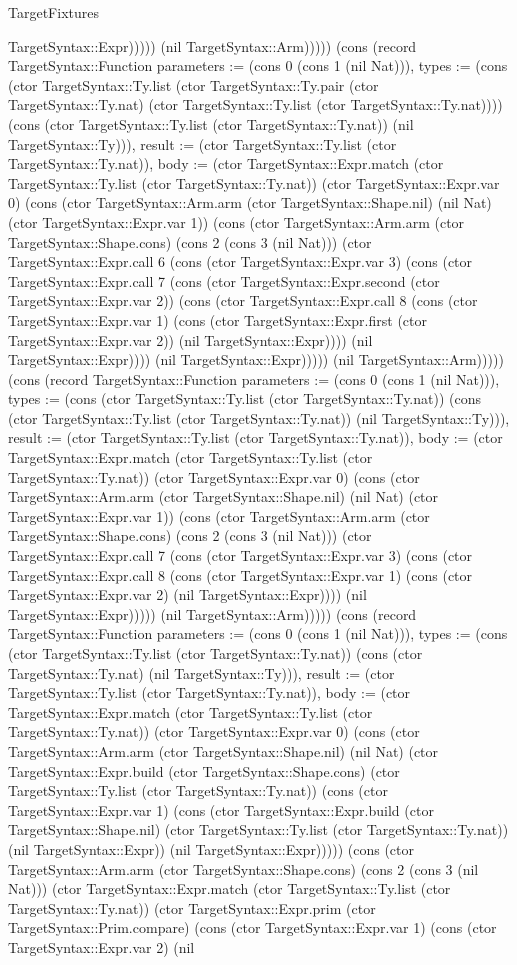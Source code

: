 \begin{lexlean}{TargetFixtures}
\begin{semanticmodule}
{TargetSyntax::Expr))))) (nil TargetSyntax::Arm))))}) (cons (record TargetSyntax::Function {parameters := (cons 0 (cons 1 (nil Nat))), types := (cons (ctor TargetSyntax::Ty.list (ctor TargetSyntax::Ty.pair (ctor TargetSyntax::Ty.nat) (ctor TargetSyntax::Ty.list (ctor TargetSyntax::Ty.nat)))) (cons (ctor TargetSyntax::Ty.list (ctor TargetSyntax::Ty.nat)) (nil TargetSyntax::Ty))), result := (ctor TargetSyntax::Ty.list (ctor TargetSyntax::Ty.nat)), body := (ctor TargetSyntax::Expr.match (ctor TargetSyntax::Ty.list (ctor TargetSyntax::Ty.nat)) (ctor TargetSyntax::Expr.var 0) (cons (ctor TargetSyntax::Arm.arm (ctor TargetSyntax::Shape.nil) (nil Nat) (ctor TargetSyntax::Expr.var 1)) (cons (ctor TargetSyntax::Arm.arm (ctor TargetSyntax::Shape.cons) (cons 2 (cons 3 (nil Nat))) (ctor TargetSyntax::Expr.call 6 (cons (ctor TargetSyntax::Expr.var 3) (cons (ctor TargetSyntax::Expr.call 7 (cons (ctor TargetSyntax::Expr.second (ctor TargetSyntax::Expr.var 2)) (cons (ctor TargetSyntax::Expr.call 8 (cons (ctor TargetSyntax::Expr.var 1) (cons (ctor TargetSyntax::Expr.first (ctor TargetSyntax::Expr.var 2)) (nil TargetSyntax::Expr)))) (nil TargetSyntax::Expr)))) (nil TargetSyntax::Expr))))) (nil TargetSyntax::Arm))))}) (cons (record TargetSyntax::Function {parameters := (cons 0 (cons 1 (nil Nat))), types := (cons (ctor TargetSyntax::Ty.list (ctor TargetSyntax::Ty.nat)) (cons (ctor TargetSyntax::Ty.list (ctor TargetSyntax::Ty.nat)) (nil TargetSyntax::Ty))), result := (ctor TargetSyntax::Ty.list (ctor TargetSyntax::Ty.nat)), body := (ctor TargetSyntax::Expr.match (ctor TargetSyntax::Ty.list (ctor TargetSyntax::Ty.nat)) (ctor TargetSyntax::Expr.var 0) (cons (ctor TargetSyntax::Arm.arm (ctor TargetSyntax::Shape.nil) (nil Nat) (ctor TargetSyntax::Expr.var 1)) (cons (ctor TargetSyntax::Arm.arm (ctor TargetSyntax::Shape.cons) (cons 2 (cons 3 (nil Nat))) (ctor TargetSyntax::Expr.call 7 (cons (ctor TargetSyntax::Expr.var 3) (cons (ctor TargetSyntax::Expr.call 8 (cons (ctor TargetSyntax::Expr.var 1) (cons (ctor TargetSyntax::Expr.var 2) (nil TargetSyntax::Expr)))) (nil TargetSyntax::Expr))))) (nil TargetSyntax::Arm))))}) (cons (record TargetSyntax::Function {parameters := (cons 0 (cons 1 (nil Nat))), types := (cons (ctor TargetSyntax::Ty.list (ctor TargetSyntax::Ty.nat)) (cons (ctor TargetSyntax::Ty.nat) (nil TargetSyntax::Ty))), result := (ctor TargetSyntax::Ty.list (ctor TargetSyntax::Ty.nat)), body := (ctor TargetSyntax::Expr.match (ctor TargetSyntax::Ty.list (ctor TargetSyntax::Ty.nat)) (ctor TargetSyntax::Expr.var 0) (cons (ctor TargetSyntax::Arm.arm (ctor TargetSyntax::Shape.nil) (nil Nat) (ctor TargetSyntax::Expr.build (ctor TargetSyntax::Shape.cons) (ctor TargetSyntax::Ty.list (ctor TargetSyntax::Ty.nat)) (cons (ctor TargetSyntax::Expr.var 1) (cons (ctor TargetSyntax::Expr.build (ctor TargetSyntax::Shape.nil) (ctor TargetSyntax::Ty.list (ctor TargetSyntax::Ty.nat)) (nil TargetSyntax::Expr)) (nil TargetSyntax::Expr))))) (cons (ctor TargetSyntax::Arm.arm (ctor TargetSyntax::Shape.cons) (cons 2 (cons 3 (nil Nat))) (ctor TargetSyntax::Expr.match (ctor TargetSyntax::Ty.list (ctor TargetSyntax::Ty.nat)) (ctor TargetSyntax::Expr.prim (ctor TargetSyntax::Prim.compare) (cons (ctor TargetSyntax::Expr.var 1) (cons (ctor TargetSyntax::Expr.var 2) (nil }
\end{semanticmodule}
\end{lexlean}
